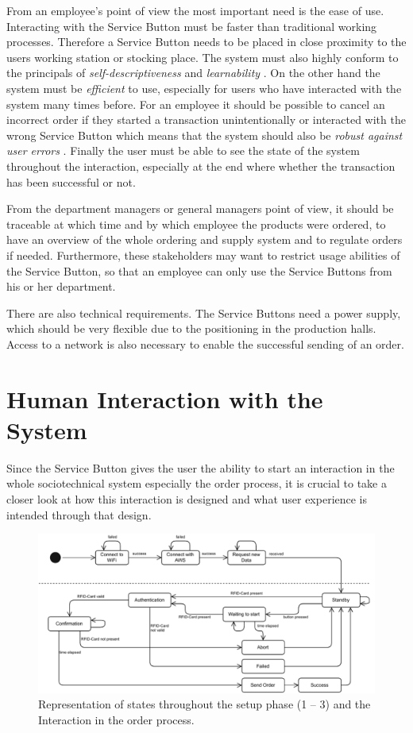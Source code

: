 From an employee's point of view the most important need is the ease of use. Interacting with the Service Button must be faster than traditional working processes. Therefore a Service Button needs to be placed in close proximity to the users working station or stocking place. The system must also highly conform to the principals of \textit{self-descriptiveness} and \textit{learnability} \cite{ISO:9241-110:2020}. On the other hand the system must be \textit{efficient} \cite{ISO:9241-110:2020} to use, especially for users who have interacted with the system many times before. For an employee it should be possible to cancel an incorrect order if they started a transaction unintentionally or interacted with the wrong Service Button which means that the system should also be \textit{robust against user errors} \cite{ISO:9241-110:2020}.
Finally the user must be able to see the state of the system throughout the interaction, especially at the end where whether the transaction has been successful or not.

From the department managers or general managers point of view, it should be traceable at which time and by which employee the products were ordered, to have an overview of the whole ordering and supply system and to regulate orders if needed. Furthermore, these stakeholders may want to restrict usage abilities of the Service Button, so that an employee can only use the Service Buttons from his or her department.

There are also technical requirements. The Service Buttons need a power supply, which should be very flexible due to the positioning in the production halls. Access to a network is also necessary to enable the successful sending of an order.

\section{Human Interaction with the System}
\label{sec:Interaction}

Since the Service Button gives the user the ability to start an interaction in the whole sociotechnical system especially the order process, it is crucial to take a closer look at how this interaction is designed and what user experience is intended through that design.

\begin{figure}
    \center
    \includegraphics[width=\linewidth]{figures/states.drawio.pdf}
    \caption{Representation of states throughout the setup phase (1 – 3) and the Interaction in the order process.}
    \label{fig:states}
\end{figure}

